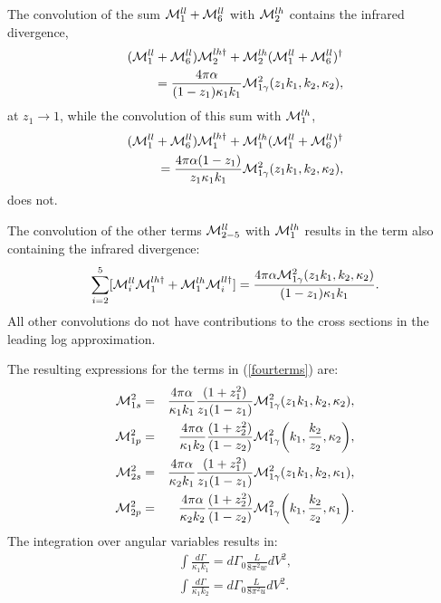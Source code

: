 \documentclass[aps,prd,reprint,groupedaddress,preprintnumbers,showpacs]{revtex4-1}
\begin{document}
The convolution of the sum ${\cal M}^{ll}_1+{\cal M}^{ll}_6$ with ${\cal M}^{lh}_2$ 
contains the infrared divergence,
\begin{eqnarray}
({\cal M}^{ll}_1+{\cal M}^{ll}_6){\cal M}^{lh\dagger}_2+
{\cal M}^{lh}_2
({\cal M}^{ll}_1+{\cal M}^{ll}_6)^\dagger
\nonumber\\
={4\pi \alpha \over (1- z_1)\kappa _1 k_1} 
{\cal M}^2_{1\gamma }(z_1 k_1,k_2,\kappa_2),
\end{eqnarray}
at $z_1\to 1$, while the convolution of this sum with ${\cal M}^{lh}_1$,
\begin{eqnarray}
({\cal M}^{ll}_1+{\cal M}^{ll}_6){\cal M}^{lh\dagger}_1+
{\cal M}^{lh}_1
({\cal M}^{ll}_1+{\cal M}^{ll}_6)^\dagger
\nonumber\\
={4\pi \alpha (1-z_1)\over z_1\kappa _1 k_1} 
{\cal M}^2_{1\gamma }(z_1 k_1,k_2,\kappa_2),
\end{eqnarray}
does not.

The convolution of the other terms ${\cal M}^{ll}_{2-5}$ with ${\cal M}^{lh}_1$ results in the term also containing the infrared divergence:
\begin{eqnarray}
\sum\limits_{i=2}^5
[{\cal M}^{ll}_i{\cal M}^{lh\dagger}_1
+
{\cal M}^{lh}_1
{\cal M}^{ll\dagger}_i ]
=
{4\pi \alpha {\cal M}_{1\gamma}^2(z_1 k_1,k_2,\kappa_2)\over (1- z_1)\kappa _1 k_1}. 
\nonumber\\
\end{eqnarray}
All other convolutions do not have contributions to the cross sections in the leading log approximation.

%

The resulting expressions for the terms in (\ref{fourterms}) are:
\begin{eqnarray}
{\cal M}_{1s}^2 
&=&{4\pi \alpha \over \kappa_1 k_1}{(1+z_1^2)\over z_1(1- z_1)}
{\cal M}^2_{1\gamma }(z_1 k_1,k_2,\kappa_2),
\nonumber \\
{\cal M}_{1p}^2 
&=&{4\pi \alpha \over \kappa_1 k_2}{(1+z_2^2)\over (1- z_2)}
{\cal M}^2_{1\gamma }\biggl(k_1,{k_2 \over z_2},\kappa_2 \biggr),
\nonumber \\
{\cal M}_{2s}^2 
&=&{4\pi \alpha \over \kappa_2 k_1}{(1+z_1^2)\over z_1(1- z_1)}
{\cal M}^2_{1\gamma }(z_1 k_1,k_2,\kappa_1),
\nonumber \\
{\cal M}_{2p}^2 
&=&{4\pi \alpha \over \kappa_2 k_2}{(1+z_2^2)\over (1- z_2)}
{\cal M}^2_{1\gamma }\biggl(k_1,{k_2 \over z_2},\kappa_1\biggr).
\end{eqnarray}
The integration over angular variables results in:
\begin{eqnarray}
\int \frac {d\Gamma}{\kappa _1k_1}=
d\Gamma_0
\frac{L}{8\pi^2w}dV^2,
\nonumber \\
\int \frac {d\Gamma}{\kappa _1k_2}=
d\Gamma_0
\frac{L}{8\pi^2u}dV^2.
\end{eqnarray}
\end{document}
